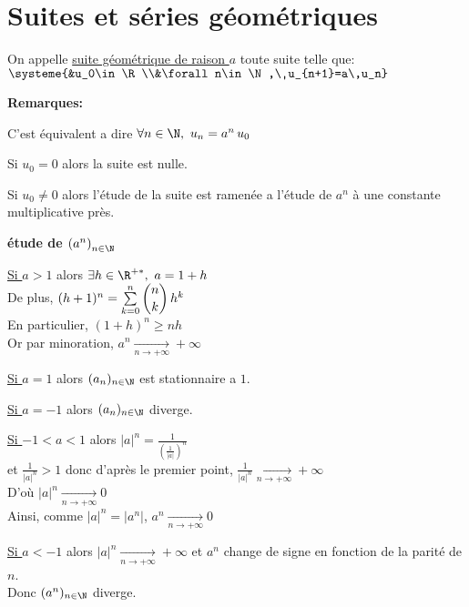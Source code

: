 \documentclass[12pt,twoside,a4paper]{article}
\author{MPSI 2}
\begin{document}
	\maketitle
	\section{Suites et s\'eries g\'eom\'etriques}
		\begin{defi}
			On appelle \underline{suite g\'eom\'etrique de raison $a$} toute suite telle que:\\
			$\systeme{&u_0\in\R\\&\forall n\in\N,\ u_{n+1}=a\,u_n}$
		\end{defi}
		\begin{flushleft}
			\textbf{Remarques:}
			\begin{liste}
				\item C'est \'equivalent a dire $\forall n\in\N,\ u_n=a^n\,u_0$
				\item Si $u_0=0$ alors la suite est nulle.
				\item Si $u_0\neq 0$ alors l'\'etude de la suite est ramen\'ee a l'\'etude de $a^n$ \`a une constante multiplicative pr\`es.
			\end{liste}
		\end{flushleft}
		\begin{flushleft}
			\textbf{\'etude de $\left(a^n\right)_{n\in\N}$}
			\begin{liste}
				\item \underline{Si $a>1$} alors $\exists h\in\R^{+*},\ a=1+h$\\
					De plus, $(h+1)^n=\sum\limits_{k=0}^{n}\dbinom{n}{k}\,h^k$\\
					En particulier, $(1+h)^n\geqslant nh$\\
					Or par minoration, $a^n\mathop{\longrightarrow}\limits_{n\rightarrow+\infty}+\infty$
				\item \underline{Si $a=1$} alors $(a_n)_{n\in\N}$ est stationnaire a $1$.
				\item \underline{Si $a=-1$} alors $(a_n)_{n\in\N}$ diverge.
				\item \underline{Si $-1<a<1$} alors $|a|^n=\frac{1}{\left(\frac{1}{|a|}\right)^n}$\\
					et $\frac{1}{|a|^n}>1$ donc d'apr\`es le premier point, $\frac1{|a|^n}\mathop{\longrightarrow}\limits_{n\rightarrow+\infty}+\infty$\\
					D'o\`u $|a|^n\mathop{\longrightarrow}\limits_{n\rightarrow+\infty}0$\\
					Ainsi, comme $|a|^n=|a^n|$, $a^n\mathop{\longrightarrow}\limits_{n\rightarrow+\infty}0$
				\item \underline{Si $a<-1$} alors $|a|^n\mathop{\longrightarrow}\limits_{n\rightarrow+\infty}+\infty$ et $a^n$ change de signe en fonction de la parit\'e de $n$.\\
					Donc $(a^n)_{n\in\N}$ diverge.
			\end{liste}
		\end{flushleft}
\end{document}
